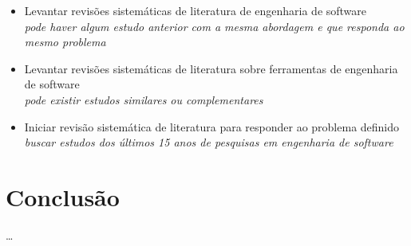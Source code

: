 \documentclass[conference]{IEEEtran}
\begin{document}
\begin{itemize}
\item Levantar revisões sistemáticas de literatura de engenharia de software\\
        {\it pode haver algum estudo anterior com a mesma abordagem e que
        responda ao mesmo problema}
\item Levantar revisões sistemáticas de literatura sobre ferramentas de
        engenharia de software\\
        {\it pode existir estudos similares ou complementares}
\item Iniciar revisão sistemática de literatura para responder ao problema
        definido\\
        {\it buscar estudos dos últimos 15 anos de pesquisas em engenharia de
        software}
\end{itemize}

\section{Conclusão}

\ldots



\end{document}
